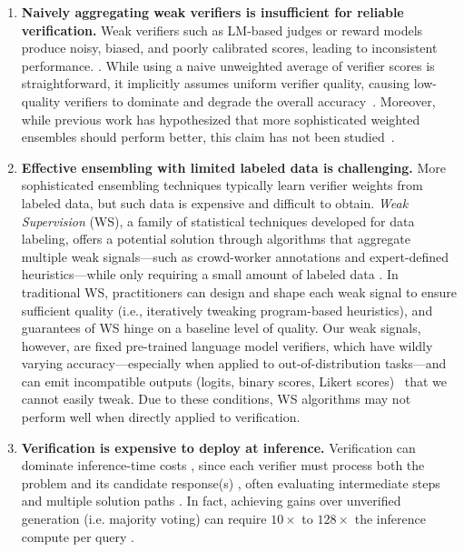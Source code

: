 \begin{enumerate} [itemsep=0.00pt,topsep=0pt,leftmargin=12pt]
    \item \textbf{Naively aggregating weak verifiers is insufficient for reliable verification.} Weak verifiers such as LM-based judges or reward models produce noisy, biased, and poorly calibrated scores, leading to inconsistent performance. \citep{stroebl2024inferencescalingflawslimits, lambert2024rewardbenchevaluatingrewardmodels, chiang2024chatbot}. 
    While using a naive unweighted average of verifier scores is straightforward, it implicitly assumes uniform verifier quality, causing low-quality verifiers to dominate and degrade the overall accuracy~\citep{verga2024replacingjudgesjuriesevaluating, xu2024perfectblendredefiningrlhf, eisenstein2023helping}. Moreover, while previous work has hypothesized that more sophisticated weighted ensembles should perform better, this claim has not been studied~\citep{lifshitz2025multiagentverificationscalingtesttime}. 
   
    \item \textbf{Effective ensembling with limited labeled data is challenging.} More sophisticated ensembling techniques typically learn verifier weights from labeled data, but such data is expensive and difficult to obtain. 
    \textit{Weak Supervision} (WS), a family of statistical techniques developed for data labeling, offers a potential solution through algorithms that aggregate multiple weak signals---such as crowd-worker annotations and expert-defined heuristics---while only requiring a small amount of labeled data \citep{ratner2016data, ratner2019training, fu2020fast}.  
    In traditional WS, practitioners can design and shape each weak signal to ensure sufficient quality (i.e., iteratively tweaking program-based heuristics), and guarantees of WS hinge on a baseline level of quality.
    Our weak signals, however, are fixed pre-trained language model verifiers, which have wildly varying accuracy---especially when applied to out-of-distribution tasks---and can emit incompatible outputs (logits, binary scores, Likert scores)~\citep{lambert2024rewardbenchevaluatingrewardmodels} that we cannot easily tweak. Due to these conditions, WS algorithms may not perform well when directly applied to verification.
    \item \textbf{Verification is expensive to deploy at inference.}
    Verification can dominate inference-time costs \citep{singhi2025solveverifycomputeoptimalproblem, liu20251bllmsurpass405b}, since each verifier must process both the problem and its candidate response(s) \cite{lightman2023letsverifystepstep}, often evaluating intermediate steps \cite{lightman2023letsverifystepstep} and multiple solution paths \cite{snell2024scalingllmtesttimecompute}. 
    In fact, achieving gains over unverified generation (i.e. majority voting) can require $10\times$ to $128\times$ the inference compute per query \citep{singhi2025whentosolve, lifshitz2025multiagentverificationscalingtesttime, zhao2025sample, chen2025sets}. 
    
\end{enumerate}


